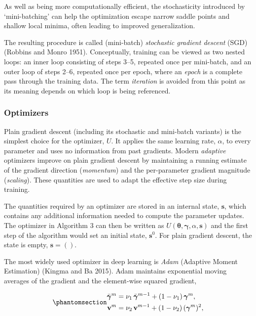 \documentclass[
  letterpaper,
  krantz2]{style/krantz}
\begin{document}
As well as being more computationally efficient, the stochasticity
introduced by `mini-batching' can help the optimization escape narrow
saddle points and shallow local minima, often leading to improved
generalization.

The resulting procedure is called (mini-batch) \emph{stochastic gradient
descent} (SGD) (Robbins and Monro 1951). Conceptually, training can be
viewed as two nested loops: an inner loop consisting of steps 3--5,
repeated once per mini-batch, and an outer loop of steps 2--6, repeated
once per epoch, where an \emph{epoch} is a complete pass through the
training data. The term \emph{iteration} is
avoided from this point as its meaning depends on which loop is being
referenced.

\subsubsection{Optimizers}\label{sec-nn-opt}

Plain gradient descent (including its stochastic and mini-batch
variants) is the simplest choice for the optimizer,
\(U\). It applies the same learning
rate, \(\alpha\), to every parameter and uses no information from past
gradients. Modern
\emph{adaptive} optimizers improve on plain gradient descent by
maintaining a running estimate of the gradient direction
(\emph{momentum}) and the per-parameter gradient magnitude
(\emph{scaling}). These quantities are used to adapt the effective step
size during training.

The quantities required by an optimizer are stored in an internal state,
\(\mathbf{s}\), which contains any additional information needed to
compute the parameter updates. The optimizer in Algorithm 3 can then be
written as
\(U(\boldsymbol{\theta}, \boldsymbol{\gamma}, \alpha, \mathbf{s})\) and
the first step of the algorithm would set an initial state,
\(\mathbf{s}^0\). For plain gradient descent, the state is empty,
\(\mathbf{s}= ()\).

The most widely used optimizer in deep learning is \emph{Adam} (Adaptive
Moment Estimation) (Kingma and Ba 2015). Adam maintains exponential
moving averages of the gradient and the element-wise squared gradient,

\begin{equation}\phantomsection\label{eq-nnet-adam-moments}{
\begin{aligned}
\bar{\boldsymbol{\gamma}}^{m} &= \nu_1\,\bar{\boldsymbol{\gamma}}^{m-1} + (1 - \nu_1)\,\boldsymbol{\gamma}^{m},\\
\mathbf{v}^{m} &= \nu_2\,\mathbf{v}^{m-1} + (1 - \nu_2)\,(\boldsymbol{\gamma}^{m})^2,
\end{aligned}
}\end{equation}
\end{document}

